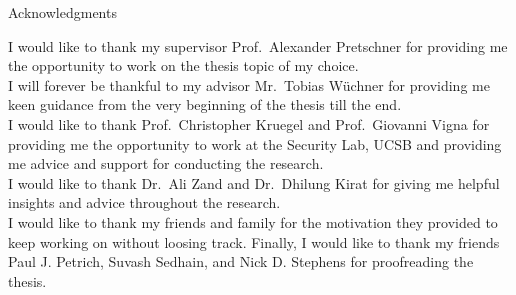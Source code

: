 \thispagestyle{empty}

\vspace*{2cm}

\begin{center}
{ Acknowledgments}
\end{center}

\vspace{1cm}

I would like to thank my supervisor Prof.\ Alexander Pretschner for providing me the opportunity to work on the thesis topic of my choice.\\
I will forever be thankful to my advisor Mr.\ Tobias Wüchner for providing me keen guidance from the very beginning of the thesis till the end.\\

I would like to thank Prof.\ Christopher Kruegel and Prof.\ Giovanni Vigna for providing me the opportunity to work at the Security Lab, UCSB and providing me advice and support for conducting the research.\\
I would like to thank Dr.\ Ali Zand and Dr.\ Dhilung Kirat for giving me helpful insights and advice throughout the research.\\

I would like to thank my friends and family for the motivation they provided to keep working on without loosing track.
Finally, I would like to thank my friends Paul J. Petrich, Suvash Sedhain, and Nick D. Stephens for proofreading the thesis.

\cleardoublepage{}
